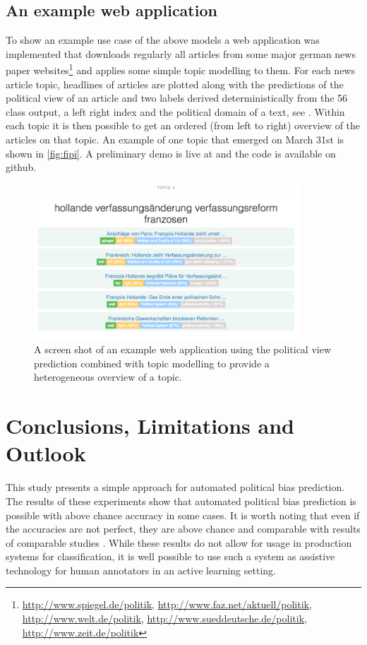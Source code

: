 \documentclass[runningheads,a4paper]{llncs}
\begin{document}
\subsection{An example web application}
To show an example use case of the above models a web application was implemented that downloads regularly all articles from some major german news paper websites\footnote{\url{http://www.spiegel.de/politik}, \url{http://www.faz.net/aktuell/politik}, \url{http://www.welt.de/politik}, \url{http://www.sueddeutsche.de/politik}, \url{http://www.zeit.de/politik}} and applies some simple topic modelling to them. For each news article topic, headlines of articles are plotted along with the predictions of the political view of an article and two labels derived deterministically from the 56 class output, a left right index and the political domain of a text, see \cite{leftright}. Within each topic it is then possible to get an ordered (from left to right) overview of the articles on that topic. An example of one topic that emerged on March 31st is shown in \autoref{fig:fipi}. A preliminary demo is live at \cite{fipidemo} and the code is available on github\cite{fipi}.
\begin{figure}
\begin{center}
\includegraphics[width=10cm]{images/fipi-screenshot}
%
\end{center}
\caption{
\label{fig:fipi}
A screen shot of an example web application using the political view prediction combined with topic modelling to provide a heterogeneous overview of a topic. }
\end{figure}


\section{Conclusions, Limitations and Outlook}\label{sec:conclusion}
This study presents a simple approach for automated political bias prediction. The results of these experiments show that automated political bias prediction is possible with above chance accuracy in some cases. It is worth noting that even if the accuracies are not perfect, they are above chance and comparable with results of comparable studies \cite{Yu2008, Hirst2014}. While these results do not allow for usage in production systems for classification, it is well possible to use such a system as assistive technology for human annotators in an active learning setting.
\end{document}
